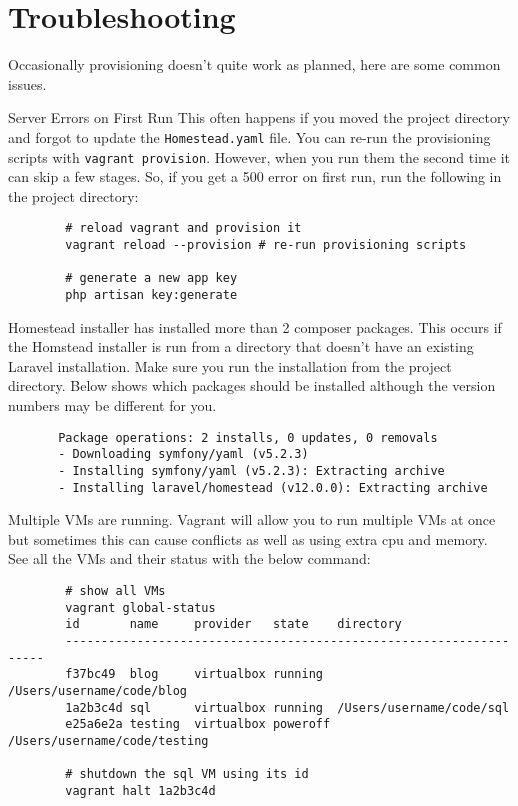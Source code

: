 \section{Troubleshooting}

Occasionally provisioning doesn't quite work as planned, here are some common issues.

\begin{infobox}{Server Errors on First Run}
    This often happens if you moved the project directory and forgot to update the \texttt{Homestead.yaml} file.
    You can re-run the provisioning scripts with \texttt{vagrant provision}.
    However, when you run them the second time it can skip a few stages. So, if you get a 500 error on first run, run the following in the project directory:

    \begin{verbatim}
        # reload vagrant and provision it
        vagrant reload --provision # re-run provisioning scripts

        # generate a new app key
        php artisan key:generate
    \end{verbatim}
\end{infobox}

\begin{infobox}{Homestead installer has installed more than 2 composer packages.}
    This occurs if the Homstead installer is run from a directory that doesn't have an existing Laravel installation.
    Make sure you run the installation from the project directory. Below shows which packages should be installed although the version numbers may be different for you.

    \begin{verbatim}
       Package operations: 2 installs, 0 updates, 0 removals
       - Downloading symfony/yaml (v5.2.3)
       - Installing symfony/yaml (v5.2.3): Extracting archive
       - Installing laravel/homestead (v12.0.0): Extracting archive
    \end{verbatim}
\end{infobox}

\begin{infobox}{Multiple VMs are running.}
    Vagrant will allow you to run multiple VMs at once but sometimes this can cause conflicts as well as using extra cpu and memory.
    See all the VMs and their status with the below command:

    \begin{verbatim}
        # show all VMs
        vagrant global-status
        id       name     provider   state    directory
        -------------------------------------------------------------------
        f37bc49  blog     virtualbox running  /Users/username/code/blog
        1a2b3c4d sql      virtualbox running  /Users/username/code/sql
        e25a6e2a testing  virtualbox poweroff /Users/username/code/testing

        # shutdown the sql VM using its id
        vagrant halt 1a2b3c4d
    \end{verbatim}
\end{infobox}

